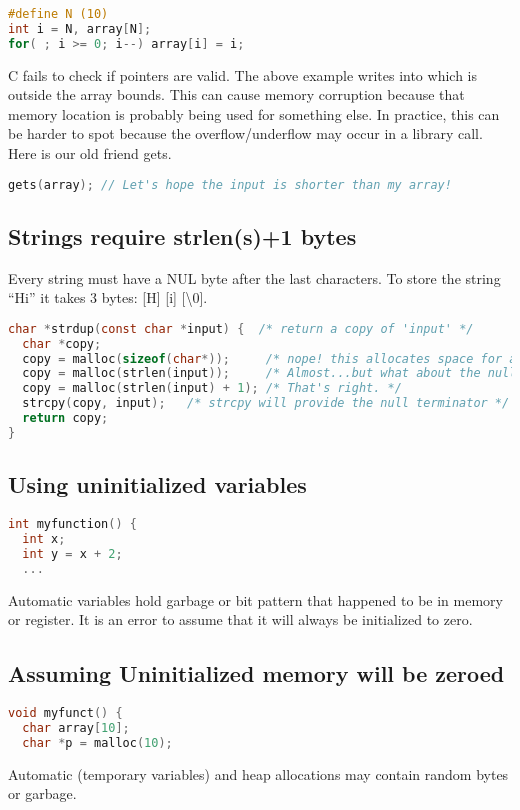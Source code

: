 \begin{lstlisting}[language=C]
#define N (10)
int i = N, array[N];
for( ; i >= 0; i--) array[i] = i;
\end{lstlisting}

C fails to check if pointers are valid.
The above example writes into  which is outside the array bounds.
This can cause memory corruption because that memory location is probably being used for something else.
In practice, this can be harder to spot because the overflow/underflow may occur in a library call.
Here is our old friend gets.

\begin{lstlisting}[language=C]
gets(array); // Let's hope the input is shorter than my array!
\end{lstlisting}


\subsection{Strings require strlen(s)+1 bytes}

Every string must have a NUL byte after the last characters.
To store the string ``Hi'' it takes 3 bytes: [H] [i] [\backslash 0].

\begin{lstlisting}[language=C]
char *strdup(const char *input) {  /* return a copy of 'input' */
  char *copy;
  copy = malloc(sizeof(char*));     /* nope! this allocates space for a pointer, not a string */
  copy = malloc(strlen(input));     /* Almost...but what about the null terminator? */
  copy = malloc(strlen(input) + 1); /* That's right. */
  strcpy(copy, input);   /* strcpy will provide the null terminator */
  return copy;
}
\end{lstlisting}

\subsection{Using uninitialized variables}

\begin{lstlisting}[language=C]
int myfunction() {
  int x;
  int y = x + 2;
  ...
\end{lstlisting}

Automatic variables hold garbage or bit pattern that happened to be in memory or register.
It is an error to assume that it will always be initialized to zero.

\subsection{Assuming Uninitialized memory will be zeroed}

\begin{lstlisting}[language=C]
void myfunct() {
  char array[10];
  char *p = malloc(10);
\end{lstlisting}

Automatic (temporary variables) and heap allocations may contain random bytes or garbage.
